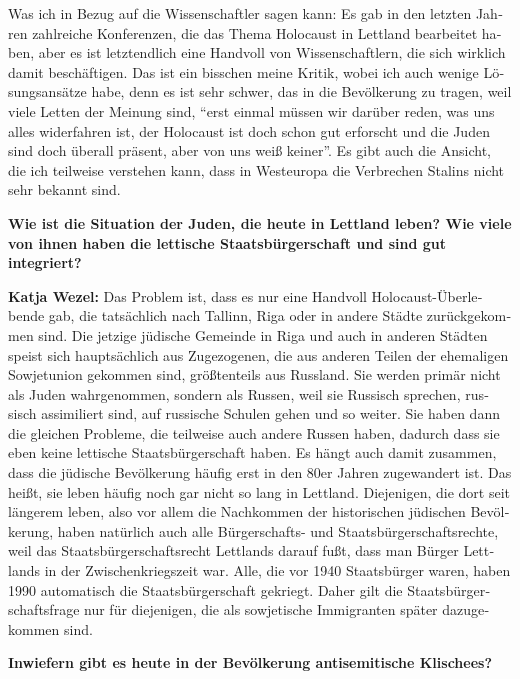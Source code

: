 \begin{otherlanguage}{ngerman}
Was ich in Bezug auf die Wissenschaftler sagen kann: Es gab in den letzten Jahren zahlreiche Konferenzen, die das Thema Holocaust in Lettland bearbeitet haben, aber es ist letztendlich eine Handvoll von Wissenschaftlern, die sich wirklich damit beschäftigen. Das ist ein bisschen meine Kritik, wobei ich auch wenige Lösungsansätze habe, denn es ist sehr schwer, das in die Bevölkerung zu tragen, weil viele Letten der Meinung sind, "`erst einmal müssen wir darüber reden, was uns alles widerfahren ist, der Holocaust ist doch schon gut erforscht und die Juden sind doch überall präsent, aber von uns weiß keiner"'. Es gibt auch die Ansicht, die ich teilweise verstehen kann, dass in Westeuropa die Verbrechen Stalins nicht sehr bekannt sind. 

\textbf{Wie ist die Situation der Juden, die heute in Lettland leben? Wie viele von ihnen haben die lettische Staatsbürgerschaft und sind gut integriert?} 

\textbf{Katja Wezel:} Das Problem ist, dass es nur eine Handvoll Holocaust-Überlebende gab, die tatsächlich nach Tallinn, Riga oder in andere Städte zurückgekommen sind. Die jetzige jüdische Gemeinde in Riga und auch in anderen Städten speist sich hauptsächlich aus Zugezogenen, die aus anderen Teilen der ehemaligen Sowjetunion gekommen sind, größtenteils aus Russland. Sie werden primär nicht als Juden wahrgenommen, sondern als Russen, weil sie Russisch sprechen, russisch assimiliert sind, auf russische Schulen gehen und so weiter. Sie haben dann die gleichen Probleme, die teilweise auch andere Russen haben, dadurch dass sie eben keine lettische Staatsbürgerschaft haben. Es hängt auch damit zusammen, dass die jüdische Bevölkerung häufig erst in den 80er Jahren zugewandert ist. Das heißt, sie leben häufig noch gar nicht so lang in Lettland. Diejenigen, die dort seit längerem leben, also vor allem die Nachkommen der historischen jüdischen Bevölkerung, haben natürlich auch alle Bürgerschafts- und Staatsbürgerschaftsrechte, weil das Staatsbürgerschaftsrecht Lettlands darauf fußt, dass man Bürger Lettlands in der Zwischenkriegszeit war. Alle, die vor 1940 Staatsbürger waren, haben 1990 automatisch die Staatsbürgerschaft gekriegt. Daher gilt die Staatsbürgerschaftsfrage nur für diejenigen, die als sowjetische Immigranten später dazugekommen sind. 

\textbf{Inwiefern gibt es heute in der Bevölkerung antisemitische Klischees?} 


\end{otherlanguage}
